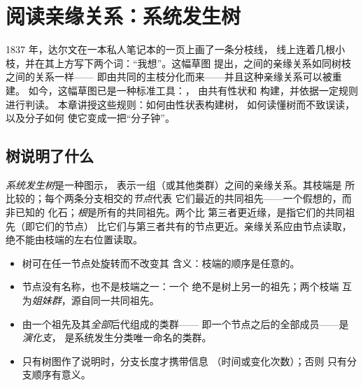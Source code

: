\chapter{阅读亲缘关系：系统发生树}\label{ch:g12:phylogenetic-trees}

1837 年，达尔文在一本私人笔记本的一页上画了一条分枝线，
线上连着几根小枝，并在其上方写下两个词：“我想”。这幅草图
提出，之间的亲缘关系如同树枝之间的关系一样——
即由共同的主枝分化而来——并且这种亲缘关系可以被重建。
如今，这幅草图已是一种标准工具：，
由共有性状和  构建，并依据一定规则进行判读。
本章讲授这些规则：如何由性状表构建树，
如何读懂树而不致误读，以及分子如何
使它变成一把“分子钟”。

\section{树说明了什么}

\begin{definition}[系统发生树]\label{def:g12:phylogenetic-trees:tree}
\emph{系统发生树}是一种图示，
表示一组（或其他类群）之间的亲缘关系。其枝端是
所比较的；每个两条分支相交的\emph{节点}代表
它们最近的共同祖先——一个假想的，而非已知的
化石；\emph{根}是所有的共同祖先。两个比
第三者更近缘，是指它们的共同祖先（即它们的节点）
比它们与第三者共有的节点更近。亲缘关系应由节点读取，
绝不能由枝端的左右位置读取。
\end{definition}

\begin{proposition}[阅读规则]\label{prop:g12:phylogenetic-trees:rules}
\begin{itemize}
  \item 树可在任一节点处旋转而不改变其
        含义：枝端的顺序是任意的。
  \item 节点没有名称，也不是枝端之一：一个
        绝不是树上另一的祖先；两个枝端
        互为\emph{姐妹群}，源自同一共同祖先。
  \item 由一个祖先及其\emph{全部}后代组成的类群——
        即一个节点之后的全部成员——是\emph{演化支}，
        是系统发生分类唯一命名的类群。
  \item 只有树图作了说明时，分支长度才携带信息
        （时间或变化次数）；否则
        只有分支顺序有意义。
\end{itemize}
\end{proposition}
\admitted

